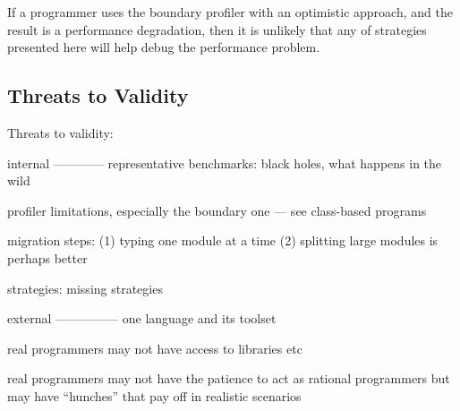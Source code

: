 If a programmer uses the boundary profiler with an optimistic approach,
and the result is a performance degradation, then it is unlikely that any
of strategies presented here will help debug the performance problem. 


\subsection{Threats to Validity} \label{subsec:threats}


Threats to validity:

internal
————
representative benchmarks: black holes, what happens in the wild 


profiler limitations, especially the boundary one — see class-based
programs

migration steps: (1) typing one module at a time 
                 (2) splitting large modules is perhaps better

strategies: missing strategies


external
—————
one language and its toolset 

real programmers may not have access to libraries etc

real programmers may not have the patience to act as rational programmers
but may have ``hunches'' that pay off in realistic scenarios 


